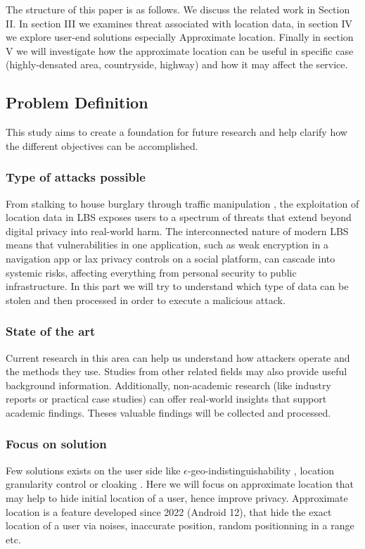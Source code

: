 \documentclass[9pt,conference]{IEEEtran}
\begin{document}
The structure of this paper is as follows. We discuss the related work in Section II. In section III we examines threat associated with location data, in section IV we explore user-end solutions especially Approximate location. Finally in section V we will investigate how the approximate location can be useful in specific case (highly-densated area, countryside, highway) and how it may affect the service.


\subsection*{Problem Definition}
This study aims to create a foundation for future research and help clarify how the different objectives can be accomplished.
\subsubsection*{Type of attacks possible}
From stalking to house burglary through traffic manipulation \cite{insidegnss2023privacy}, the exploitation of location data in LBS exposes users to a spectrum of threats that extend beyond digital privacy into real-world harm. The interconnected nature of modern LBS means that vulnerabilities in one application, such as weak encryption in a navigation app or lax privacy controls on a social platform, can cascade into systemic risks, affecting everything from personal security to public infrastructure. In this part we will try to understand which type of data can be stolen and then processed in order to execute a malicious attack.
\subsubsection*{State of the art}
Current research in this area can help us understand how attackers operate and the methods they use. Studies from other related fields may also provide useful background information. Additionally, non-academic research (like industry reports or practical case studies) can offer real-world insights that support academic findings. Theses valuable findings will be collected and processed.
\subsubsection*{Focus on solution}
Few solutions exists on the user side like $\epsilon$-geo-indistinguishability \cite{Heitmann02012025}, location granularity control \cite{CSS2013TransfoLocation} or cloaking \cite{cloaking}. Here we will focus on approximate location that may help to hide initial location of a user, hence improve privacy. Approximate location is a feature developed since 2022 (Android 12), that hide the exact location of a user via noises, inaccurate position, random positionning in a range etc. 
\end{document}
